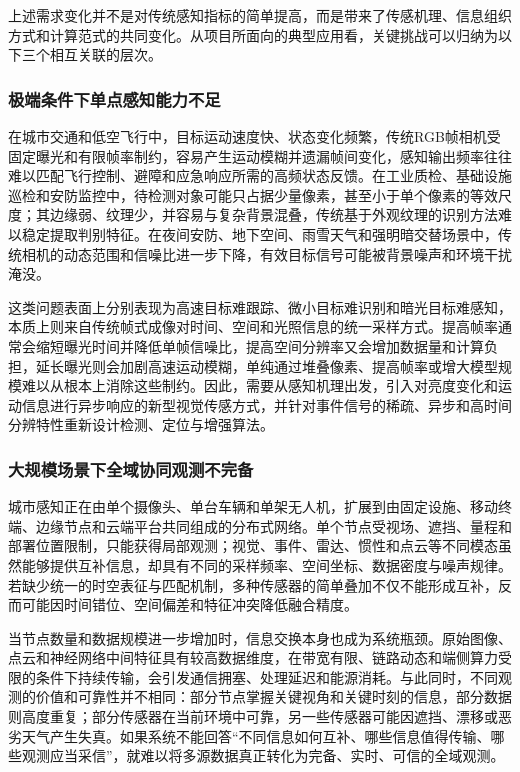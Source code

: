 上述需求变化并不是对传统感知指标的简单提高，而是带来了传感机理、信息组织方式和计算范式的共同变化。从项目所面向的典型应用看，关键挑战可以归纳为以下三个相互关联的层次。

\subsubsection{极端条件下单点感知能力不足}

在城市交通和低空飞行中，目标运动速度快、状态变化频繁，传统RGB帧相机受固定曝光和有限帧率制约，容易产生运动模糊并遗漏帧间变化，感知输出频率往往难以匹配飞行控制、避障和应急响应所需的高频状态反馈。在工业质检、基础设施巡检和安防监控中，待检测对象可能只占据少量像素，甚至小于单个像素的等效尺度；其边缘弱、纹理少，并容易与复杂背景混叠，传统基于外观纹理的识别方法难以稳定提取判别特征。在夜间安防、地下空间、雨雪天气和强明暗交替场景中，传统相机的动态范围和信噪比进一步下降，有效目标信号可能被背景噪声和环境干扰淹没。

这类问题表面上分别表现为高速目标难跟踪、微小目标难识别和暗光目标难感知，本质上则来自传统帧式成像对时间、空间和光照信息的统一采样方式。提高帧率通常会缩短曝光时间并降低单帧信噪比，提高空间分辨率又会增加数据量和计算负担，延长曝光则会加剧高速运动模糊，单纯通过堆叠像素、提高帧率或增大模型规模难以从根本上消除这些制约。因此，需要从感知机理出发，引入对亮度变化和运动信息进行异步响应的新型视觉传感方式，并针对事件信号的稀疏、异步和高时间分辨特性重新设计检测、定位与增强算法。

\subsubsection{大规模场景下全域协同观测不完备}

城市感知正在由单个摄像头、单台车辆和单架无人机，扩展到由固定设施、移动终端、边缘节点和云端平台共同组成的分布式网络。单个节点受视场、遮挡、量程和部署位置限制，只能获得局部观测；视觉、事件、雷达、惯性和点云等不同模态虽然能够提供互补信息，却具有不同的采样频率、空间坐标、数据密度与噪声规律。若缺少统一的时空表征与匹配机制，多种传感器的简单叠加不仅不能形成互补，反而可能因时间错位、空间偏差和特征冲突降低融合精度。

当节点数量和数据规模进一步增加时，信息交换本身也成为系统瓶颈。原始图像、点云和神经网络中间特征具有较高数据维度，在带宽有限、链路动态和端侧算力受限的条件下持续传输，会引发通信拥塞、处理延迟和能源消耗。与此同时，不同观测的价值和可靠性并不相同：部分节点掌握关键视角和关键时刻的信息，部分数据则高度重复；部分传感器在当前环境中可靠，另一些传感器可能因遮挡、漂移或恶劣天气产生失真。如果系统不能回答“不同信息如何互补、哪些信息值得传输、哪些观测应当采信”，就难以将多源数据真正转化为完备、实时、可信的全域观测。

